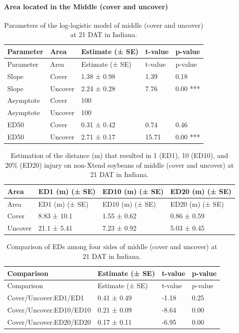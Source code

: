 \documentclass[]{article}
\let\oldparagraph\paragraph
\renewcommand{\paragraph}[1]{\oldparagraph{#1}\mbox{}}
\begin{document}
\newpage

\paragraph{\texorpdfstring{Area located in the \textbf{Middle} (cover
and
uncover)}{Area located in the Middle (cover and uncover)}}\label{area-located-in-the-middle-cover-and-uncover}

\begin{longtable}[]{@{}lllll@{}}
\caption{Parameters of the log-logistic model of middle (cover and
uncover) at 21 DAT in Indiana.}\tabularnewline
\toprule
Parameter & Area & Estimate (± SE) & t-value & p-value\tabularnewline
\midrule
\endfirsthead
\toprule
Parameter & Area & Estimate (± SE) & t-value & p-value\tabularnewline
\midrule
\endhead
Slope & Cover & 1.38 ± 0.98 & 1.39 & 0.18\tabularnewline
Slope & Uncover & 2.24 ± 0.28 & 7.76 & 0.00 ***\tabularnewline
Asymptote & Cover & 100 & &\tabularnewline
Asymptote & Uncover & 100 & &\tabularnewline
ED50 & Cover & 0.31 ± 0.42 & 0.74 & 0.46\tabularnewline
ED50 & Uncover & 2.71 ± 0.17 & 15.71 & 0.00 ***\tabularnewline
\bottomrule
\end{longtable}

\begin{longtable}[]{@{}llll@{}}
\caption{Estimation of the distance (m) that resulted in 1 (ED1), 10
(ED10), and 20\% (ED20) injury on non-Xtend soybeans of middle (cover
and uncover) at 21 DAT in Indiana.}\tabularnewline
\toprule
Area & ED1 (m) (± SE) & ED10 (m) (± SE) & ED20 (m) (± SE)\tabularnewline
\midrule
\endfirsthead
\toprule
Area & ED1 (m) (± SE) & ED10 (m) (± SE) & ED20 (m) (± SE)\tabularnewline
\midrule
\endhead
Cover & 8.83 ± 10.1 & 1.55 ± 0.62 & 0.86 ± 0.59\tabularnewline
Uncover & 21.1 ± 5.41 & 7.23 ± 0.92 & 5.03 ± 0.45\tabularnewline
\bottomrule
\end{longtable}

\begin{longtable}[]{@{}llll@{}}
\caption{Comparison of EDs among four sides of middle (cover and
uncover) at 21 DAT in Indiana.}\tabularnewline
\toprule
Comparison & Estimate (± SE) & t-value & p-value\tabularnewline
\midrule
\endfirsthead
\toprule
Comparison & Estimate (± SE) & t-value & p-value\tabularnewline
\midrule
\endhead
Cover/Uncover:ED1/ED1 & 0.41 ± 0.49 & -1.18 & 0.25\tabularnewline
Cover/Uncover:ED10/ED10 & 0.21 ± 0.09 & -8.64 & 0.00\tabularnewline
Cover/Uncover:ED20/ED20 & 0.17 ± 0.11 & -6.95 & 0.00\tabularnewline
\bottomrule
\end{longtable}
\end{document}
